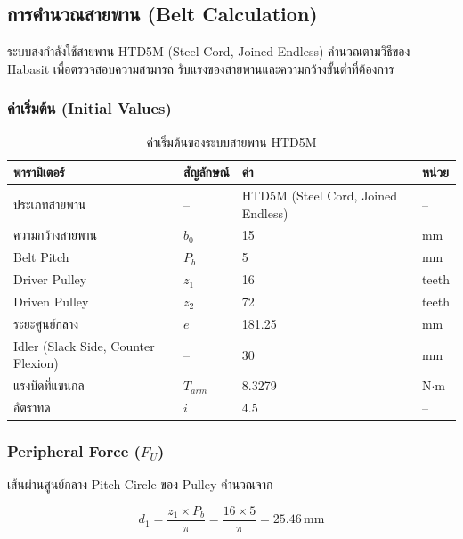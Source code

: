 \subsection{การคำนวณสายพาน (Belt Calculation)}
\label{subsec:belt_calc}

ระบบส่งกำลังใช้สายพาน HTD5M (Steel Cord, Joined Endless)
คำนวณตามวิธีของ Habasit เพื่อตรวจสอบความสามารถ
รับแรงของสายพานและความกว้างขั้นต่ำที่ต้องการ

\subsubsection{ค่าเริ่มต้น (Initial Values)}

\begin{table}[H]
  \centering
  \caption{ค่าเริ่มต้นของระบบสายพาน HTD5M}
  \label{tab:belt_initial}
  \begin{tabular}{llll}
    \toprule
    พารามิเตอร์ & สัญลักษณ์ & ค่า & หน่วย \\
    \midrule
    ประเภทสายพาน   & --        & HTD5M (Steel Cord, Joined Endless) & -- \\
    ความกว้างสายพาน & $b_0$    & 15    & mm \\
    Belt Pitch      & $P_b$    & 5     & mm \\
    Driver Pulley   & $z_1$    & 16    & teeth \\
    Driven Pulley   & $z_2$    & 72    & teeth \\
    ระยะศูนย์กลาง   & $e$      & 181.25 & mm \\
    Idler (Slack Side, Counter Flexion) & -- & 30 & mm \\
    แรงบิดที่แขนกล  & $T_{arm}$ & 8.3279 & N$\cdot$m \\
    อัตราทด         & $i$      & 4.5   & -- \\
    \bottomrule
  \end{tabular}
\end{table}

\subsubsection{Peripheral Force ($F_U$)}

เส้นผ่านศูนย์กลาง Pitch Circle ของ Pulley คำนวณจาก

\begin{equation}
  d_1 = \frac{z_1 \times P_b}{\pi}
      = \frac{16 \times 5}{\pi}
      = 25.46\,\text{mm}
  \label{eq:belt_d1}
\end{equation}

